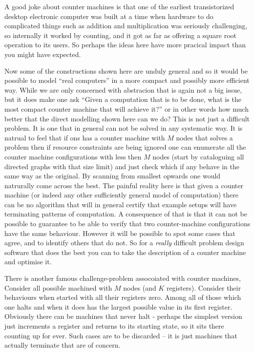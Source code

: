 A good joke about counter machines is that one of the earliest
transistorized desktop electronic computer was built at a time when
hardware to do complicated things such as addition and multiplication
was seriously challenging, so internally it worked by counting, and it
got as far as offering a square root operation to its users. So perhaps
the ideas here have more pracical impact than you might have expected.

Now some of the constructions shown here are unduly general and so it
would be possible to model ``real computers'' in a more compact and possibly
more efficient way. While we are only concerned with abstracion that is again
not a big issue, but it does make one ask ``Given a computation that is
to be done, what is the most compact counter machine that will achieve it?''
or in other words how much better that the direct modelling shown here
can we do? This is not just a difficult problem. It is one that in general
can not be solved in any systematic way. It is natrual to feel that if
ons has a counter machine with $M$ nodes that solves a problem then if
resource constraints are being ignored one can enumerate all the
counter machine configurations with less then $M$ nodes (start by
cataloguing all directed graphs with that size limit) and just check
which if any behave in the same way as the original. By scanning from
smallest opwards one would natrurally come across the best. The painful
reality here is that given a counter machine (or indeed any other sufficiently
general model of computation) there can be no algorithm that will in
general certify that example setups will have terminating patterns
of computation. A consequence of that is that it can not be possible
to guarantee to be able to verify that two counter-machine configurations
have the same behaviour. However it will be possible to spot some
cases that agree, and to identify others that do not. So for a {\em really}
difficult problem design software that does the best you can to
take the description of a counter machine and optimise it.

There is another famous challenge-problem assocoiated with counter machines,
Consider all possible machined with $M$ nodes (and $K$ registers).
Consider their behaviours when started with all their registers zero.
Among all of those which one halts and when it does has the
largest possible value in its first register.
Obviously there can be machines that never halt - perhaps
the simplest version just increments a register and returns to its
starting state, so it sits there counting up for ever. Such cases are
to be discarded -- it is just machines that actually terminate that
are of concern.

